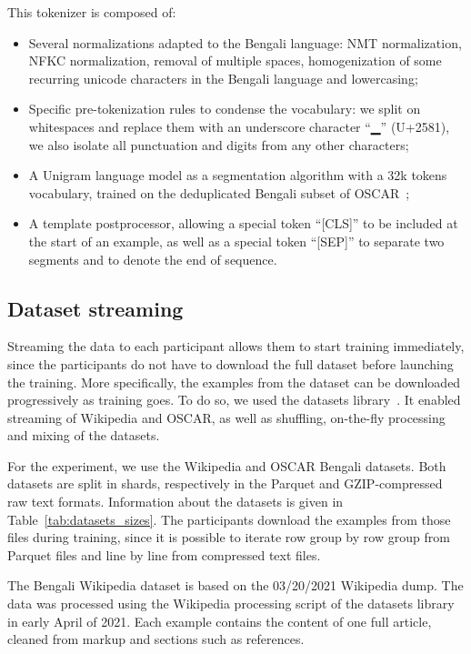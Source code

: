 This tokenizer is composed of:
\begin{itemize}[leftmargin=*]
    \item Several normalizations adapted to the Bengali language: NMT normalization, NFKC normalization, removal of multiple spaces, homogenization of some recurring unicode characters in the Bengali language and lowercasing;
    \item Specific pre-tokenization rules to condense the vocabulary: we split on whitespaces and replace them with an underscore character ``▁'' (U+2581), we also isolate all punctuation and digits from any other characters;
    \item A Unigram language model as a segmentation algorithm with a 32k tokens vocabulary, trained on the deduplicated Bengali subset of OSCAR~\cite{Oscar};
    \item A template postprocessor, allowing a special token ``[CLS]'' to be included at the start of an example, as well as a special token ``[SEP]'' to separate two segments and to denote the end of sequence.
\end{itemize}


\subsection{Dataset streaming}\label{appendix:dataset_streaming}

Streaming the data to each participant allows them to start training immediately, since the participants do not have to download the full dataset before launching the training. More specifically, the examples from the dataset can be downloaded progressively as training goes. To do so, we used the datasets library~\cite{datasets}. It enabled streaming of Wikipedia and OSCAR, as well as shuffling, on-the-fly processing and mixing of the datasets.

For the experiment, we use the Wikipedia and OSCAR Bengali datasets. Both datasets are split in shards, respectively in the Parquet and GZIP-compressed raw text formats. Information about the datasets is given in Table~\ref{tab:datasets_sizes}. 
The participants download the examples from those files during training, since it is possible to iterate row group by row group from Parquet files and line by line from compressed text files.

The Bengali Wikipedia dataset is based on the 03/20/2021 Wikipedia dump.
The data was processed using the Wikipedia processing script of the datasets library in early April of 2021.
Each example contains the content of one full article, cleaned from markup and sections such as references.


